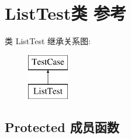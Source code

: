 \hypertarget{class_list_test}{}\section{List\+Test类 参考}
\label{class_list_test}
类 List\+Test 继承关系图\+:\begin{figure}[H]
\begin{center}
\leavevmode
\includegraphics[height=2.000000cm]{class_list_test}
\end{center}
\end{figure}
\subsection*{Protected 成员函数}
